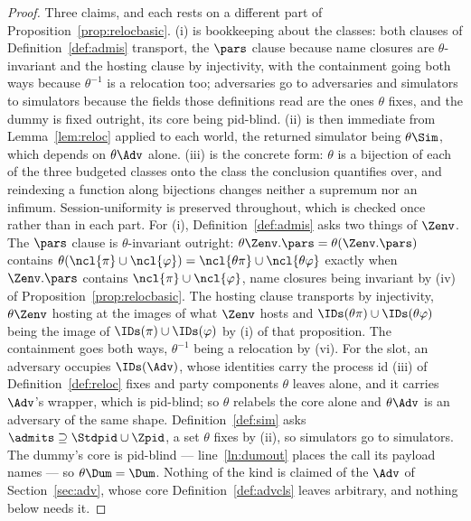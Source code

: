 \documentclass[10pt,oneside,openany]{book}
\theoremstyle{accentdef}
\theoremstyle{accentplain}
\begin{document}
\begin{proof}
Three claims, and each rests on a different part of Proposition~\ref{prop:relocbasic}. (i) is
bookkeeping about the classes: both clauses of Definition~\ref{def:admis} transport, the $\pars$
clause because name closures are $\theta$-invariant and the hosting clause by injectivity, with the
containment going both ways because $\theta^{-1}$ is a relocation too; adversaries go to adversaries
and simulators to simulators because the fields those definitions read are the ones $\theta$ fixes,
and the dummy is fixed outright, its core being pid-blind. (ii) is then immediate from
Lemma~\ref{lem:reloc} applied to each world, the returned simulator being $\theta\Sim$, which
depends on $\theta\Adv$ alone. (iii) is the concrete form: $\theta$ is a bijection of each of the
three budgeted classes onto the class the conclusion quantifies over, and reindexing a function
along bijections changes neither a supremum nor an infimum. Session-uniformity is preserved
throughout, which is checked once rather than in each part.
For (i), Definition~\ref{def:admis} asks two things of $\Zenv$. The $\pars$ clause is
$\theta$-invariant outright: $\theta\Zenv.\pars = \theta(\Zenv.\pars)$ contains
$\theta(\ncl{\pi} \cup \ncl{\varphi}) = \ncl{\theta\pi} \cup \ncl{\theta\varphi}$ exactly when
$\Zenv.\pars$ contains $\ncl{\pi} \cup \ncl{\varphi}$, name closures being invariant by (iv) of
Proposition~\ref{prop:relocbasic}. The hosting clause transports by injectivity, $\theta\Zenv$
hosting at the images of what $\Zenv$ hosts and $\IDs(\theta\pi) \cup \IDs(\theta\varphi)$ being the
image of $\IDs(\pi) \cup \IDs(\varphi)$ by (i) of that proposition. The containment goes both ways,
$\theta^{-1}$ being a relocation by (vi). For
the slot, an adversary occupies $\IDs(\Adv)$, whose identities carry the process id (iii) of
Definition~\ref{def:reloc} fixes and party components $\theta$ leaves alone, and it carries $\Adv$'s
wrapper, which is pid-blind; so $\theta$ relabels the core alone and $\theta\Adv$ is an adversary of
the same shape. Definition~\ref{def:sim} asks $\admits \supseteq \Stdpid \cup \Zpid$, a set $\theta$
fixes by (ii), so simulators go to simulators. The dummy's core is pid-blind --- line~\ref{ln:dumout}
places the call its payload names --- so $\theta\Dum = \Dum$. Nothing of the kind is claimed of the
$\Adv$ of Section~\ref{sec:adv}, whose core Definition~\ref{def:advcls} leaves arbitrary, and nothing
below needs it.


\end{proof}
\end{document}

